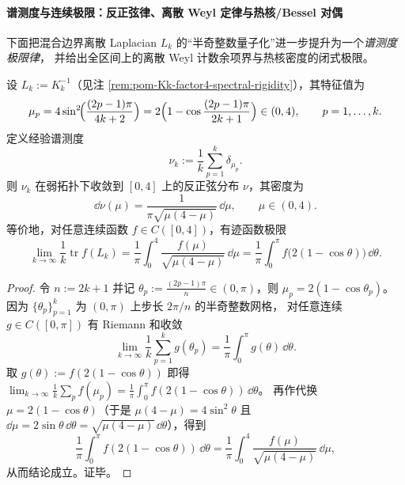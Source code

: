 \paragraph{谱测度与连续极限：反正弦律、离散 Weyl 定律与热核/Bessel 对偶}
下面把混合边界离散 Laplacian \(L_k\) 的“半奇整数量子化”进一步提升为一个\emph{谱测度极限律}，
并给出全区间上的离散 Weyl 计数余项界与热核密度的闭式极限。

\begin{theorem}[经验谱测度的反正弦极限律]\label{thm:pom-Lk-arcsine-law}
设 \(L_k:=K_k^{-1}\)（见注 \ref{rem:pom-Kk-factor4-spectral-rigidity}），其特征值为
\[
\mu_p
=4\sin^2\!\Bigl(\frac{(2p-1)\pi}{4k+2}\Bigr)
=2\Bigl(1-\cos\frac{(2p-1)\pi}{2k+1}\Bigr)\in(0,4),
\qquad p=1,\dots,k.
\]
定义经验谱测度
\[
\nu_k:=\frac{1}{k}\sum_{p=1}^{k}\delta_{\mu_p}.
\]
则 \(\nu_k\) 在弱拓扑下收敛到 \([0,4]\) 上的反正弦分布 \(\nu\)，其密度为
\[
\dd\nu(\mu)=\frac{1}{\pi\sqrt{\mu(4-\mu)}}\,\dd\mu,\qquad \mu\in(0,4).
\]
等价地，对任意连续函数 \(f\in C([0,4])\)，有迹函数极限
\[
\lim_{k\to\infty}\frac{1}{k}\operatorname{tr}f(L_k)
=\frac{1}{\pi}\int_{0}^{4}\frac{f(\mu)}{\sqrt{\mu(4-\mu)}}\,\dd\mu
=\frac{1}{\pi}\int_{0}^{\pi} f\!\bigl(2(1-\cos\theta)\bigr)\,\dd\theta.
\]
\end{theorem}
\begin{proof}
令 \(n:=2k+1\) 并记 \(\theta_p:=\frac{(2p-1)\pi}{n}\in(0,\pi)\)，则 \(\mu_p=2(1-\cos\theta_p)\)。
因为 \(\{\theta_p\}_{p=1}^k\) 为 \((0,\pi)\) 上步长 \(2\pi/n\) 的半奇整数网格，
对任意连续 \(g\in C([0,\pi])\) 有 Riemann 和收敛
\[
\lim_{k\to\infty}\frac{1}{k}\sum_{p=1}^{k} g(\theta_p)
=\frac{1}{\pi}\int_0^\pi g(\theta)\,\dd\theta.
\]
取 \(g(\theta):=f(2(1-\cos\theta))\) 即得
\(
\lim_{k\to\infty}\frac{1}{k}\sum_{p} f(\mu_p)=\frac{1}{\pi}\int_0^\pi f(2(1-\cos\theta))\,\dd\theta
\)。
再作代换 \(\mu=2(1-\cos\theta)\)（于是 \(\mu(4-\mu)=4\sin^2\theta\) 且 \(\dd\mu=2\sin\theta\,\dd\theta=\sqrt{\mu(4-\mu)}\,\dd\theta\)），得到
\[
\frac{1}{\pi}\int_0^\pi f(2(1-\cos\theta))\,\dd\theta
=\frac{1}{\pi}\int_0^4 \frac{f(\mu)}{\sqrt{\mu(4-\mu)}}\,\dd\mu,
\]
从而结论成立。证毕。
\end{proof}


